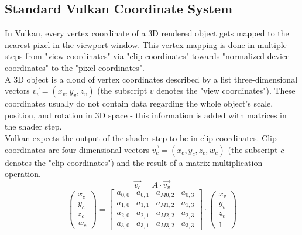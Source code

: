 \subsection{Standard Vulkan Coordinate System}
In Vulkan, every vertex coordinate of a 3D rendered object gets mapped to the nearest pixel in the viewport window. This vertex mapping is done in multiple steps from "view coordinates" via "clip coordinates" towards "normalized device coordinates" to the "pixel coordinates".\\
A 3D object is a cloud of vertex coordinates described by a list three-dimensional vectors $\overrightarrow{v_{v}} = (x_{v},y_{v},z_{v})$ (the subscript $v$ denotes the "view coordinates"). These coordinates usually do not contain data regarding the whole object's scale, position, and rotation in 3D space - this information is added with matrices in the shader step.\\
Vulkan expects the output of the shader step to be in clip coordinates. Clip coordinates are four-dimensional vectors $\overrightarrow{v_{c}} = (x_{c},y_{c},z_{c},w_{c})$ (the subscript $c$ denotes the "clip coordinates") and the result of a matrix multiplication operation.\\
\begin{equation*}
    \overrightarrow{v_{c}} = A \cdot  \overrightarrow{v_{v}}
\end{equation*}
\begin{equation*}
    \begin{pmatrix}
        x_{c} \\
        y_{c} \\
        z_{c} \\
        w_{c}
    \end{pmatrix}
    =
    \begin{bmatrix}
        a_{0,0} & a_{0,1} & a_{M 0,2} & a_{0,3} \\
        a_{1,0} & a_{1,1} & a_{M 1,2} & a_{1,3} \\
        a_{2,0} & a_{2,1} & a_{M 2,2} & a_{2,3} \\
        a_{3,0} & a_{3,1} & a_{M 3,2} & a_{3,3}
    \end{bmatrix}
    \cdot
    \begin{pmatrix}
        x_{v} \\
        y_{v} \\
        z_{v} \\
        1
    \end{pmatrix}
\end{equation*}
